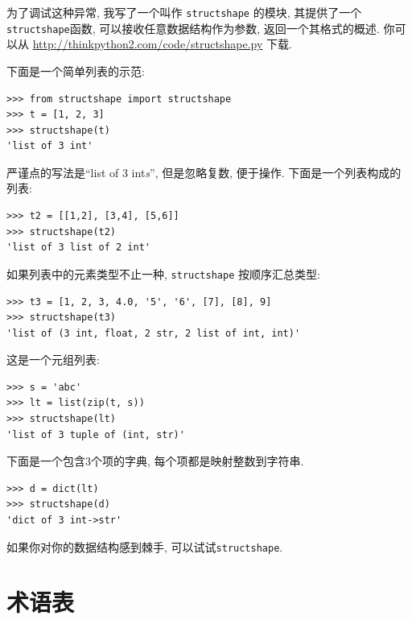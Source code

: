 \documentclass[10pt]{book}
\begin{document}
为了调试这种异常, 我写了一个叫作 {\tt structshape} 的模块, 
其提供了一个{\tt structshape}函数, 可以接收任意数据结构作为参数, 
返回一个其格式的概述. 
你可以从 \url{http://thinkpython2.com/code/structshape.py} 下载. 

下面是一个简单列表的示范:

\begin{verbatim}
>>> from structshape import structshape
>>> t = [1, 2, 3]
>>> structshape(t)
'list of 3 int'
\end{verbatim}
%

严谨点的写法是``list of 3 int{\em s}'', 
但是忽略复数, 便于操作. 下面是一个列表构成的列表:

\begin{verbatim}
>>> t2 = [[1,2], [3,4], [5,6]]
>>> structshape(t2)
'list of 3 list of 2 int'
\end{verbatim}
%
如果列表中的元素类型不止一种, 
{\tt structshape} 按顺序汇总类型:

\begin{verbatim}
>>> t3 = [1, 2, 3, 4.0, '5', '6', [7], [8], 9]
>>> structshape(t3)
'list of (3 int, float, 2 str, 2 list of int, int)'
\end{verbatim}
%
这是一个元组列表:

\begin{verbatim}
>>> s = 'abc'
>>> lt = list(zip(t, s))
>>> structshape(lt)
'list of 3 tuple of (int, str)'
\end{verbatim}
%
下面是一个包含3个项的字典, 每个项都是映射整数到字符串.

\begin{verbatim}
>>> d = dict(lt) 
>>> structshape(d)
'dict of 3 int->str'
\end{verbatim}
%
如果你对你的数据结构感到棘手, 可以试试{\tt structshape}.


\section{术语表}
\end{document}
